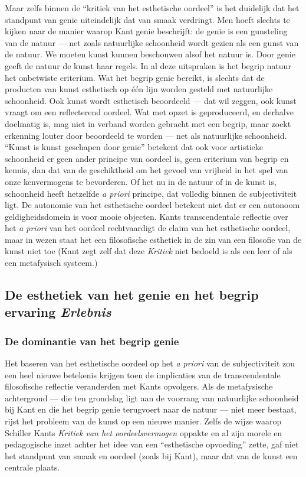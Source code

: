 Maar zelfs binnen de ``kritiek van het esthetische oordeel'' is het duidelijk dat het standpunt van genie uiteindelijk dat van smaak verdringt. Men hoeft slechts te kijken naar de manier waarop Kant genie beschrijft: de genie is een gunsteling van de natuur — net zoals natuurlijke schoonheid wordt gezien als een gunst van de natuur. We moeten kunst kunnen beschouwen alsof het natuur is. Door genie geeft de natuur de kunst haar regels. In al deze uitspraken is het begrip natuur het onbetwiste criterium. Wat het begrip genie bereikt, is slechts dat de producten van kunst esthetisch op één lijn worden gesteld met natuurlijke schoonheid. Ook kunst wordt esthetisch beoordeeld — dat wil zeggen, ook kunst vraagt om een reflecterend oordeel. Wat met opzet is geproduceerd, en derhalve doelmatig is, mag niet in verband worden gebracht met een begrip, maar zoekt erkenning louter door beoordeeld te worden — net als natuurlijke schoonheid. ``Kunst is kunst geschapen door genie'' betekent dat ook voor artistieke schoonheid er geen ander principe van oordeel is, geen criterium van begrip en kennis, dan dat van de geschiktheid om het gevoel van vrijheid in het spel van onze kenvermogens te bevorderen. Of het nu in de natuur of in de kunst is, schoonheid heeft hetzelfde \textit{a priori} principe, dat volledig binnen de subjectiviteit ligt. De autonomie van het esthetische oordeel betekent niet dat er een autonoom geldigheidsdomein is voor mooie objecten. Kants transcendentale reflectie over het \textit{a priori} van het oordeel rechtvaardigt de claim van het esthetische oordeel, maar in wezen staat het een filosofische esthetiek in de zin van een filosofie van de kunst niet toe (Kant zegt zelf dat deze \textit{Kritiek} niet bedoeld is als een leer of als een metafysisch systeem.)

\subsection{De esthetiek van het genie en het begrip ervaring \textit{Erlebnis}}

\subsubsection{De dominantie van het begrip genie}

Het baseren van het esthetische oordeel op het \textit{a priori} van de subjectiviteit zou een heel nieuwe betekenis krijgen toen de implicaties van de transcendentale filosofische reflectie veranderden met Kants opvolgers. Als de metafysische achtergrond — die ten grondslag ligt aan de voorrang van natuurlijke schoonheid bij Kant en die het begrip genie terugvoert naar de natuur — niet meer bestaat, rijst het probleem van de kunst op een nieuwe manier. Zelfs de wijze waarop Schiller Kants \textit{Kritiek van het oordeelsvermogen} oppakte en al zijn morele en pedagogische inzet achter het idee van een ``esthetische opvoeding'' zette, gaf niet het standpunt van smaak en oordeel (zoals bij Kant), maar dat van de kunst een centrale plaats.

